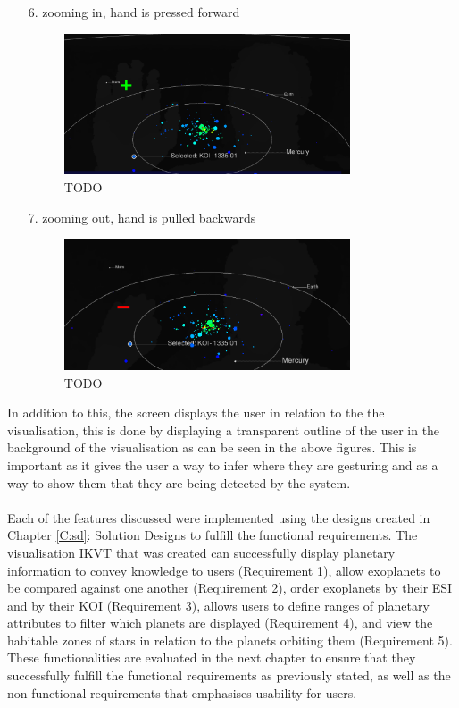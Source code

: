 \begin{enumerate}
 \item[6.] zooming in, hand is pressed forward
 \begin{figure}[H]
  \centering
      \includegraphics[width=0.8\textwidth]{images/in.PNG}
  \caption{TODO}
  \label{fig:in}
\end{figure}

 \item[7.] zooming out, hand is pulled backwards
 
\begin{figure}[H]
  \centering
      \includegraphics[width=0.8\textwidth]{images/out.PNG}
  \caption{TODO}
  \label{fig:out}
\end{figure}

\end{enumerate}

In addition to this, the screen displays the user in relation to the
the visualisation, this is done by displaying a transparent outline of
the user in the background of the visualisation as can be seen in the above
figures. This is important as it gives the user a way to infer where they are
gesturing and as a way to show them that they are being detected by the system.
\\\\
Each of the features discussed were implemented using the designs created in
Chapter \ref{C:sd}: Solution Designs to fulfill the functional requirements.
The visualisation IKVT that was created can successfully display planetary
information to convey knowledge to users (Requirement 1), allow exoplanets to be
compared against one another (Requirement 2), order exoplanets by their ESI and
by their KOI (Requirement 3), allows users to define ranges of planetary
attributes to filter which planets are displayed (Requirement 4), and view the
habitable zones of stars in
relation to the planets orbiting them (Requirement 5). These functionalities
are evaluated in the next chapter to ensure that they successfully fulfill the
functional requirements as previously stated, as well as the non functional
requirements that emphasises usability for users.





